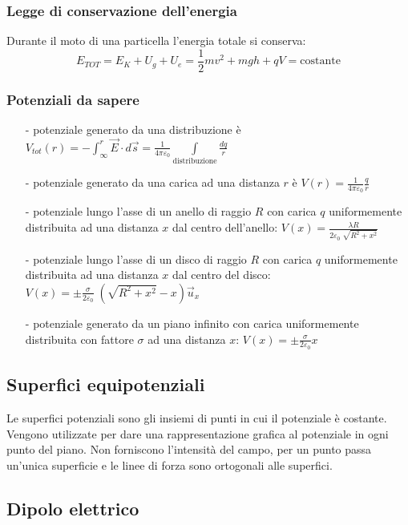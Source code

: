 \documentclass[a4paper]{article}
\newcommand\ux{\vec{u}_x}
\begin{document}
\subsubsection*{Legge di conservazione dell'energia}
Durante il moto di una particella l'energia totale si conserva:
\[E_{TOT} = E_K + U_g + U_e = \frac{1}{2} mv^2 + mgh + qV = \text{costante}\]

\subsubsection*{Potenziali da sapere}
\begin{itemize}[topsep=3pt, itemsep=0pt]
	\item[-] potenziale generato da una distribuzione è \(\displaystyle V_{tot}(r) = -\int_{\infty}^r \vec{E} \cdot d\vec{s} = \frac{1}{4 \pi \varepsilon_0} \int \limits_\text{distribuzione} \frac{dq}{r}\)
	\item[-] potenziale generato da una carica ad una distanza \(r\) è \(\displaystyle V(r) = \frac{1}{4 \pi \varepsilon_0} \frac{q}{r}\)
	\item[-] potenziale lungo l'asse di un anello di raggio \(R\) con carica \(q\) uniformemente distribuita ad una distanza
	\(x\) dal centro dell'anello: \(\displaystyle V(x) = \frac{\lambda R}{2 \varepsilon_0 \; \sqrt{R^2 + x^2}}\)
	\item[-] potenziale lungo l'asse di un disco di raggio \(R\) con carica \(q\) uniformemente distribuita ad una distanza
	\(x\) dal centro del disco: \(\displaystyle V(x) = \pm \frac{\sigma}{2 \varepsilon_0} \; \left(\sqrt{R^2 + x^2} - x\right) \ux\)
	\item[-] potenziale generato da un piano infinito con carica uniformemente distribuita con fattore \(\sigma\) ad una distanza \(x\):
	\(\displaystyle V(x) = \pm \frac{\sigma}{2 \varepsilon_0} x\)
\end{itemize}

\subsection{Superfici equipotenziali}
Le superfici potenziali sono gli insiemi di punti in cui il potenziale è costante. Vengono utilizzate per dare una rappresentazione
grafica al potenziale in ogni punto del piano. Non forniscono l'intensità del campo, per un punto passa un'unica superficie e le
linee di forza sono ortogonali alle superfici.

\subsection{Dipolo elettrico}
\end{document}
